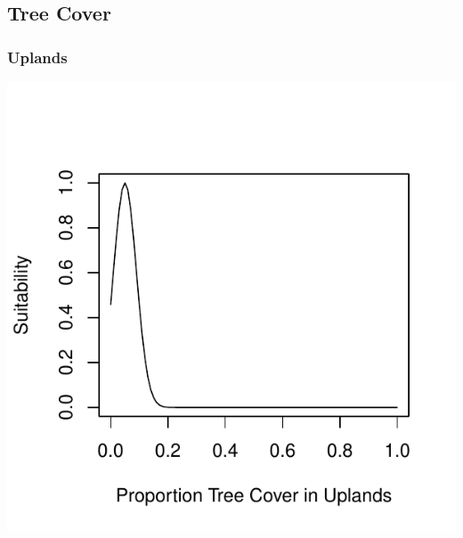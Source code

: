 \documentclass[12pt,letterpaper]{article}\usepackage{graphicx, color}
\makeatletter
\def\maxwidth{ %
  \ifdim\Gin@nat@width>\linewidth
    \linewidth
  \else
    \Gin@nat@width
  \fi
}
\newenvironment{knitrout}{}{} %
\makeatother
\begin{document}
\subsection{Tree Cover}
\subsubsection{Uplands}
\begin{knitrout}
\color{fgcolor}\includegraphics[width=\maxwidth]{figure/Sally-Dan_Tree_Cover_up} 
\end{knitrout}
\end{document}
